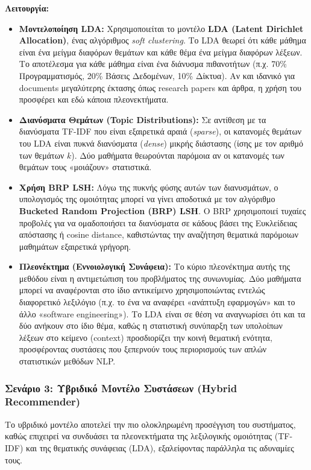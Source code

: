 \documentclass[a4paper,12pt]{article}
\begin{document}
\textbf{Λειτουργία:} 
\begin{itemize} 
    \item \textbf{Μοντελοποίηση LDA:} Χρησιμοποιείται το μοντέλο \textbf{LDA (Latent Dirichlet Allocation)}, ένας αλγόριθμος \textit{soft clustering}. Το LDA θεωρεί ότι κάθε μάθημα είναι ένα μείγμα διαφόρων θεμάτων και κάθε θέμα ένα μείγμα διαφόρων λέξεων. Το αποτέλεσμα για κάθε μάθημα είναι ένα διάνυσμα πιθανοτήτων (π.χ. 70\% Προγραμματισμός, 20\% Βάσεις Δεδομένων, 10\% Δίκτυα). Αν και ιδανικό για documents μεγαλύτερης έκτασης όπως research papers και άρθρα, η χρήση του προσφέρει και εδώ κάποια πλεονεκτήματα.

    \item \textbf{Διανύσματα Θεμάτων (Topic Distributions):} Σε αντίθεση με τα διανύσματα TF-IDF που είναι εξαιρετικά αραιά (\textit{sparse}), οι κατανομές θεμάτων του LDA είναι πυκνά διανύσματα (\textit{dense}) μικρής διάστασης (ίσης με τον αριθμό των θεμάτων $k$). Δύο μαθήματα θεωρούνται παρόμοια αν οι κατανομές των θεμάτων τους «μοιάζουν» στατιστικά.

    \item \textbf{Χρήση BRP LSH:} Λόγω της πυκνής φύσης αυτών των διανυσμάτων, ο υπολογισμός της ομοιότητας μπορεί να γίνει αποδοτικά με τον αλγόριθμο \textbf{Bucketed Random Projection (BRP) LSH}. Ο BRP χρησιμοποιεί τυχαίες προβολές για να ομαδοποιήσει τα διανύσματα σε κάδους βάσει της Ευκλείδειας απόστασης ή cosine distance, καθιστώντας την αναζήτηση θεματικά παρόμοιων μαθημάτων εξαιρετικά γρήγορη.

    \item \textbf{Πλεονέκτημα (Εννοιολογική Συνάφεια):} Το κύριο πλεονέκτημα αυτής της μεθόδου είναι η αντιμετώπιση του προβλήματος της συνωνυμίας. Δύο μαθήματα μπορεί να αναφέρονται στο ίδιο αντικείμενο χρησιμοποιώντας εντελώς διαφορετικό λεξιλόγιο (π.χ. το ένα να αναφέρει «ανάπτυξη εφαρμογών» και το άλλο «software engineering»). Το LDA είναι σε θέση να αναγνωρίσει ότι και τα δύο ανήκουν στο ίδιο θέμα, καθώς η στατιστική συνύπαρξη των υπολοίπων λέξεων στο κείμενο (context) προσδιορίζει την κοινή θεματική ενότητα, προσφέροντας συστάσεις που ξεπερνούν τους περιορισμούς των απλών στατιστικών μεθόδων NLP.
\end{itemize}

\subsubsection{Σενάριο 3: Υβριδικό Μοντέλο Συστάσεων (Hybrid Recommender)} 
Το υβριδικό μοντέλο αποτελεί την πιο ολοκληρωμένη προσέγγιση του συστήματος, καθώς επιχειρεί να συνδυάσει τα πλεονεκτήματα της λεξιλογικής ομοιότητας (TF-IDF) και της θεματικής συνάφειας (LDA), εξαλείφοντας παράλληλα τις αδυναμίες τους.
\end{document}
